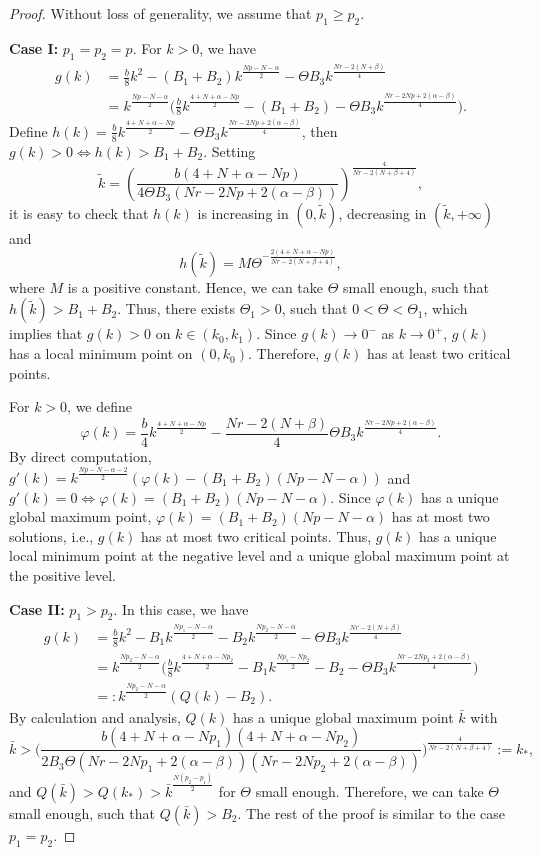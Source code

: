 \documentclass[reqno]{amsart}
\begin{document}
\begin{proof}
Without loss of generality, we assume that $p_1\geq p_2$.
\smallskip

\noindent\textbf{Case I:} $p_1=p_2=p$. For $k>0$, we have
 \begin{align*}
 g(k)&= \frac{b}{8}k^2-(B_1+B_2)k^{\frac{Np-N-\alpha}{2}}
  -\Theta B_3k^{\frac{Nr-2(N+\beta)}{4}}\\
 &= k^{\frac{Np-N-\alpha}{2}}\Big(\frac{b}{8}k^{\frac{4+N+\alpha-Np}{2}}
  -(B_1+B_2)-\Theta B_3k^{\frac{Nr-2Np+2(\alpha-\beta)}{4}}\Big).
 \end{align*}
Define $h(k)=\frac{b}{8}k^{\frac{4+N+\alpha-Np}{2}}
-\Theta B_3k^{\frac{Nr-2Np+2(\alpha-\beta)}{4}}$, then 
$g(k)>0\Leftrightarrow h(k)>B_1+B_2$.
Setting
\[
\tilde{k}=\left(\frac{b(4+N+\alpha-Np)}{4\Theta B_3(Nr-2Np
+2(\alpha-\beta))}\right)^{\frac{4}{Nr-2(N+\beta+4)}},
\]
it is easy to check that $h(k)$ is increasing in $(0,\tilde{k})$, 
decreasing in $(\tilde{k},+\infty)$ and
 \[
 h(\tilde{k})=M\Theta^{-\frac{2(4+N+\alpha-Np)}{Nr-2(N+\beta+4)}},
 \]
where $M$ is a positive constant.
Hence, we can take $\Theta$ small enough, such that $h(\tilde{k})>B_1+B_2$.
Thus, there exists $\Theta_1>0$, such that
$0<\Theta<\Theta_1$, which implies that $g(k)>0$ on $k\in(k_0,k_1)$.
Since $g(k)\to 0^-$ as $k\to 0^+$, $g(k)$ has a local minimum point on
$(0,k_0)$. Therefore, $g(k)$ has at least two critical points.

For $k>0$, we define
\[
 \varphi(k)=\frac{b}{4}k^{\frac{4+N+\alpha-Np}{2}}
 -\frac{Nr-2(N+\beta)}{4}\Theta B_3k^{\frac{Nr-2Np+2(\alpha-\beta)}{4}}.
\]
By direct computation,
$g'(k)=k^{\frac{Np-N-\alpha-2}{2}}(\varphi(k)-(B_1+B_2)(Np-N-\alpha))$ and
$g'(k)=0\Leftrightarrow \varphi(k)=(B_1+B_2)(Np-N-\alpha)$.
Since $\varphi(k)$ has a unique global maximum point,
 $\varphi(k)=(B_1+B_2)(Np-N-\alpha)$ has at most two solutions, i.e., $g(k)$ has at
most two critical points. Thus, $g(k)$ has a unique local minimum
point at the negative level and a unique global maximum point at the positive level.
\smallskip

\noindent\textbf{Case II:} $p_1>p_2$. In this case, we have
 \begin{align*}
 g(k)
 &= \frac{b}{8}k^2-B_1k^{\frac{Np_1-N-\alpha}{2}}-B_2k^{\frac{Np_2-N-\alpha}{2}}-\Theta B_3k^{\frac{Nr-2(N+\beta)}{4}}\\
 &= k^{\frac{Np_2-N-\alpha}{2}}\Big(\frac{b}{8}k^{\frac{4+N+\alpha-Np_2}{2}}
  -B_1k^{\frac{Np_1-Np_2}{2}}-B_2-
 \Theta B_3k^{\frac{Nr-2Np_2+2(\alpha-\beta)}{4}}\Big)\\
&=:k^{\frac{Np_2-N-\alpha}{2}}(Q(k)-B_2).
 \end{align*}
By calculation and analysis, $Q(k)$ has a unique global maximum point $\bar{k}$ with
\[
 \bar{k}>\Big(\frac{b(4+N+\alpha-Np_1)(4+N+\alpha-Np_2)}{2B_3\Theta(Nr-2Np_1
 +2(\alpha-\beta))(Nr-2Np_2+2(\alpha-\beta))}\Big)^{\frac{4}{Nr-2(N+\beta+4)}}:=k_*,
\]
and $Q(\bar{k})>Q(k_*)>{\bar{k}}^{\frac{N(p_2-p_1)}{2}}$ for $\Theta$ small enough.
Therefore, we can take $\Theta$ small enough,
such that $Q(\bar{k})>B_2$. The rest of the proof is similar to the case $p_1=p_2$.
\end{proof}
\end{document}
